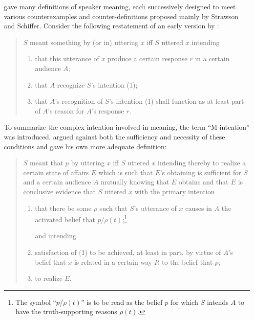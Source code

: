 \citet{grice:m, grice:umi, grice:sitwow} gave many definitions of speaker meaning, each successively designed to meet various counterexamples and counter-def\-i\-ni\-tions proposed mainly by Strawson and Schiffer. Consider the following restatement of an early version by \citet[446]{strawson:intcon}:

\begin{quote}
$S$ meant something by (or in) uttering $x$ iff $S$ uttered $x$ intending
\begin{enumerate}
\item that this utterance of $x$ produce a certain response $r$ in a certain audience $A$;
\item that $A$ recognize $S$'s intention (1);
\item that $A$'s recognition of $S$'s intention (1) shall function as at least part of $A$'s reason for $A$'s response $r$.
\end{enumerate}
\end{quote}

\noindent To summarize the complex intention involved in meaning, the term ``M-in\-ten\-tion'' was introduced. \citet[63]{schiffer:m} argued against both the sufficiency and necessity of these conditions and gave his own more adequate definition:

\begin{quote} 

$S$ meant that $p$ by uttering $x$ iff $S$ uttered $x$
intending thereby to realize a certain state of affairs $E$ which is such
that $E$'s obtaining is sufficient for $S$ and a certain audience
$A$ mutually knowing  that $E$ obtains and that $E$ is conclusive
evidence that $S$ uttered $x$ with the primary intention

\begin{enumerate}

\item that there be some $\rho$ such that $S$'s utterance of $x$
causes in $A$ the activated belief that $p$/$\rho(t)$;\footnote{The symbol ``$p$/$\rho(t)$'' is to be read as the belief $p$ for which $S$ intends $A$ to have the truth-supporting reasons $\rho(t)$.}

and intending

\item satisfaction of (1) to be achieved, at least in part, by virtue of $A$'s belief that $x$ is related in a certain way $R$ to the belief that $p$;

\item to realize $E$.

\end{enumerate}

\end{quote}

